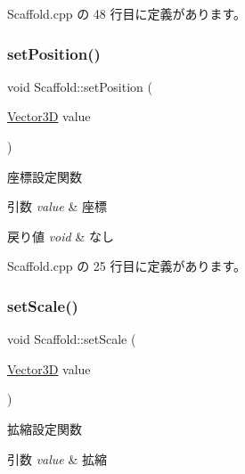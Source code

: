  Scaffold.\+cpp の 48 行目に定義があります。

\mbox{\label{class_scaffold_a690990d17bc8f44a4f0d675d7f6bbd1f}} 
\subsubsection{\texorpdfstring{set\+Position()}{setPosition()}}
{\footnotesize\ttfamily void Scaffold\+::set\+Position (\begin{DoxyParamCaption}\item[{\mbox{\hyperlink{class_vector3_d}{Vector3D}}}]{value }\end{DoxyParamCaption})}



座標設定関数 


\begin{DoxyParams}{引数}
{\em value} & 座標 \\
\hline
\end{DoxyParams}

\begin{DoxyRetVals}{戻り値}
{\em void} & なし \\
\hline
\end{DoxyRetVals}


 Scaffold.\+cpp の 25 行目に定義があります。

\mbox{\label{class_scaffold_a4527e7788208160d95369672f5cc4e25}} 
\subsubsection{\texorpdfstring{set\+Scale()}{setScale()}}
{\footnotesize\ttfamily void Scaffold\+::set\+Scale (\begin{DoxyParamCaption}\item[{\mbox{\hyperlink{class_vector3_d}{Vector3D}}}]{value }\end{DoxyParamCaption})}



拡縮設定関数 


\begin{DoxyParams}{引数}
{\em value} & 拡縮 \\
\hline
\end{DoxyParams}

